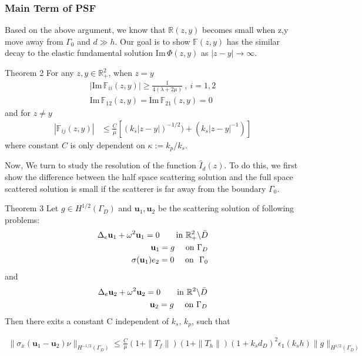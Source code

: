 \documentclass[utf-8,8pt]{beamer}
\newcommand{\R}{\mathbb{R}}
\renewcommand{\Im}{\mathrm{Im}\,}
\newcommand{\Ga}{\Gamma}
\newcommand{\bks}{\backslash}
\renewcommand{\u}{\mathbf{u}}
\renewcommand{\Im}{\mathrm{Im}\,}
\newcommand{\F}{\mathbb{F}}
\newcommand{\ben}{\begin{eqnarray*}}
\newcommand{\een}{\end{eqnarray*}}
\begin{document}
\begin{frame}
\frametitle{Main Term of PSF}
Based on the above argument, we know that $\R(z,y)$ becomes small when z,y move away from $\Gamma_0$ and $d\gg h$. Our goal is to show $\F(z,y)$ has the similar decay to the elastic fundamental solution $\Im\Phi(z,y)$ as $|z-y|\to\infty$.
\begin{block}{Theorem 2}
	For any $z,y\in \R_+^2$, when $z=y$
	\ben
	|\Im \F_{ii}(z,y)| \geq \frac{1}{4(\lambda+2\mu)} \ , \ i =1 ,2 \\
	\Im \F_{12}(z,y) = \Im \F_{21}(z,y) =0
	\een
	and for $z\neq y$
	\ben
	|\F_{ij}(z,y)|&\le \frac{C}{\mu}[(k_s|z-y|)^{-1/2})+(k_s|z-y|^{-1})]
	\een
	where constant $C$ is only dependent on $\kappa:=k_p/k_s$.
\end{block}
\end{frame}
\begin{frame}
Now, We turn to  study the resolution of the function $\hat{I}_d(z)$. To do this, we first show the difference between the half space scattering solution and the full space scattered solution is small if the scatterer is far away from the boundary $\Ga_0$.
\begin{block}{Theorem 3}
	Let $g\in H^{1/2}(\Ga_D)$ and $\u_1,\u_2$ be the scattering solution of following problems:
	\ben\label{elas_r1}
	\Delta_e \u_1 + \omega^2 \u_1=0 \qquad\mbox{\rm in } \R^2_+\bks \bar{D}\\
	\u_1= g \ \ \ \ \mbox{\rm on } \Ga_D  \label{elas_rbd}\\
	\sigma(\u_1)e_2=0 \ \ \ \ \mbox{\rm on} \ \ \Ga_0 \label{elas_rb0}
	\een
	and
	\ben {\label{elas_r2}}
	\Delta_e \u_2 + \omega^2 \u_2=0 \qquad\mbox{\rm in } \R^2\bks \bar{D}\\
	\u_2 = g \ \ \ \ \mbox{\rm on } \Ga_D  \label{elas_rbd2}
	\een
	Then there exits a constant C independent of $k_s$, $k_p$, such that

    \begin{small}
	\ben
	\|\sigma_x(\u_1-\u_2)\nu\|_{H^{-1/2}(\Gamma_D)}
	\leq \frac{C}{\mu}(1+\|T_f\|)(1+\|T_h\|)(1+k_s d_D)^2\epsilon_1(k_s h)\|g\|_{ H^{1/2}(\Ga_D)}
	\een
    \end{small}
\end{block}

\end{frame}
\end{document}
